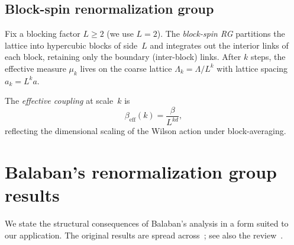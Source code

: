\documentclass[11pt]{article}
\theoremstyle{definition}
\theoremstyle{remark}
\begin{document}
\subsection{Block-spin renormalization group}

Fix a blocking factor $L \geq 2$ (we use $L = 2$).  The 
\emph{block-spin RG} partitions the lattice into hypercubic blocks 
of side~$L$ and integrates out the interior links of each block, 
retaining only the boundary (inter-block) links.  After $k$ steps, 
the effective measure $\mu_k$ lives on the coarse lattice 
$\Lambda_k = \Lambda / L^k$ with lattice spacing $a_k = L^k a$.

The \emph{effective coupling} at scale~$k$ is
\begin{equation}\label{eq:beta_eff}
  \beta_{\mathrm{eff}}(k) = \frac{\beta}{L^{kd}},
\end{equation}
reflecting the dimensional scaling of the Wilson action under 
block-averaging.

\section{Balaban's renormalization group results}\label{sec:balaban}

We state the structural consequences of Balaban's analysis in a 
form suited to our application.  The original results are spread 
across~\cite{Balaban1,Balaban2,Balaban3,Balaban4}; see also the 
review~\cite{Balaban_review}.
\end{document}
